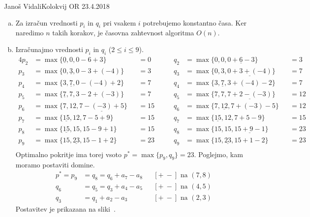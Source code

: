 \begin{naloga}{Janoš Vidali}{Kolokvij OR 23.4.2018}
\begin{odgovor}
\begin{enumerate}[(a)]
\item Za izračun vrednosti $p_i$ in $q_i$ pri vsakem $i$
potrebujemo konstantno časa.
Ker naredimo $n$ takih korakov, je časovna zahtevnost algoritma $O(n)$.

\item Izračunajmo vrednosti $p_i$ in $q_i$ ($2 \le i \le 9$).
\begin{alignat*}{4}
p_2 &= \max\{\underline{0}, 0, 0-6+3\}      &&= 0 &\qquad
q_2 &= \max\{0, 0, \underline{0+6-3}\}      &&= 3 \\
p_3 &= \max\{0, \underline{3}, 0-3+(-4)\}   &&= 3 &\qquad
q_3 &= \max\{0, 3, \underline{0+3+(-4)}\}   &&= 7 \\
p_4 &= \max\{3, \underline{7}, 0-(-4)+2\}   &&= 7 &\qquad
q_4 &= \max\{3, \underline{7}, 3+(-4)-2\}   &&= 7 \\
p_5 &= \max\{\underline{7}, 7, 3-2+(-3)\}   &&= 7 &\qquad
q_5 &= \max\{7, 7, \underline{7+2-(-3)}\}   &&= 12 \\
p_6 &= \max\{7, 12, \underline{7-(-3)+5}\}  &&= 15 &\qquad
q_6 &= \max\{7, \underline{12}, 7+(-3)-5\}  &&= 12 \\
p_7 &= \max\{\underline{15}, 12, 7-5+9\}    &&= 15 &\qquad
q_7 &= \max\{\underline{15}, 12, 7+5-9\}    &&= 15 \\
p_8 &= \max\{\underline{15}, 15, 15-9+1\}   &&= 15 &\qquad
q_8 &= \max\{15, 15, \underline{15+9-1}\}   &&= 23 \\
p_9 &= \max\{15, \underline{23}, 15-1+2\}   &&= 23 &\qquad
q_9 &= \max\{15, \underline{23}, 15+1-2\}   &&= 23 \\
\end{alignat*}
Optimalno pokritje ima torej vsoto $p^* = \max\{p_9, q_9\} = 23$.
Poglejmo, kam moramo postaviti domine.
\begin{align*}
p^* = p_9 &= q_8 = q_6 + a_7 - a_8 && \text{$[+ \ -]$ na $(7, 8)$} \\
      q_6 &= q_5 = q_3 + a_4 - a_5 && \text{$[+ \ -]$ na $(4, 5)$} \\
      q_3 &= q_1 + a_2 - a_3       && \text{$[+ \ -]$ na $(2, 3)$}
\end{align*}
Postavitev je prikazana na sliki~.
\end{enumerate}

\begin{slika}
\end{slika}
\end{odgovor}
\end{naloga}
